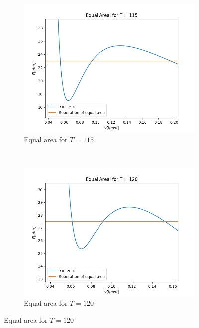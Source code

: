 \documentclass[a4paper,norsk, 10pt]{article}
\begin{document}
\begin{figure}[H]
    \centering
    \begin{subfigure}[b]{0.3\textwidth}
        \includegraphics[width=\textwidth]{T115.png}
        \caption{Equal area for $T=115$}
        \label{fig:gull}
    \end{subfigure}
    ~ 
    \begin{subfigure}[b]{0.3\textwidth}
        \includegraphics[width=\textwidth]{T120.png}
        \caption{Equal area for $T=120$}
        \label{fig:tiger}
    \end{subfigure}
\end{figure}
\end{document}
